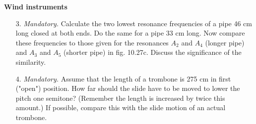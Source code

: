 \documentclass{article}
\begin{document}
  {\bf \Large Wind instruments}

\begin{itemize}
    
    \item[3.] \textit{Mandatory.} Calculate the two lowest resonance frequencies of a pipe 46 cm long closed at both ends. Do the same for a pipe 33 cm long. Now compare these frequencies to those given for the resonances $A_2$ and $A_4$ (longer pipe) and $A_3$ and $A_5$ (shorter pipe) in fig. 10.27c. Discuss the significance of the similarity.
 
    
    

    
    
     \item [4.] \textit{Mandatory.} Assume that the length of a trombone is 275 cm in first ("open") position. How far should the slide have to be moved to lower the pitch one semitone? (Remember the length is increased by twice this amount.) If possible, compare this with the slide motion of an actual trombone.
   

\end{itemize}
\end{document}
